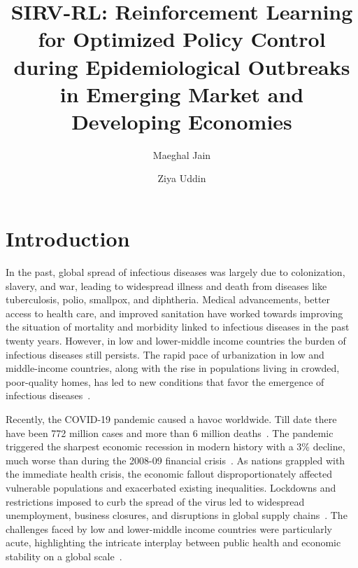 \documentclass[tikz,fleqn,12pt]{wlscirep}
\title{SIRV-RL: Reinforcement Learning for Optimized Policy Control during Epidemiological Outbreaks in Emerging Market and Developing Economies}
\author[1,*]{Maeghal Jain}
\author[1]{Ziya Uddin}
\affil[1]{BML Munjal University}
\affil[*]{e-mail: maeghaljain@gmail.com}
\begin{document}
\flushbottom
\maketitle
\thispagestyle{empty}
\section{Introduction}
In the past, global spread of infectious diseases was largely due to colonization, slavery, and war, leading to widespread illness and death from diseases like tuberculosis, polio, smallpox, and diphtheria. Medical advancements, better access to health care, and improved sanitation have worked towards improving the situation of mortality and morbidity linked to infectious diseases in the past twenty years. However, in low and lower-middle income countries the burden of infectious diseases still persists. The rapid pace of urbanization in low and middle-income countries, along with the rise in populations living in crowded, poor-quality homes, has led to new conditions that favor the emergence of infectious diseases~\cite{Baker2022,inequitableworld}.

Recently, the COVID-19 pandemic caused a havoc worldwide. Till date there have been 772 million cases and more than 6 million deaths~\cite{WHOCovid}. The pandemic triggered the sharpest economic recession in modern history with a 3\% decline, much worse than during the 2008-09 financial crisis~\cite{IMFCovid}. As nations grappled with the immediate health crisis, the economic fallout disproportionately affected vulnerable populations and exacerbated existing inequalities. Lockdowns and restrictions imposed to curb the spread of the virus led to widespread unemployment, business closures, and disruptions in global supply chains~\cite{Nicola2020}. The challenges faced by low and lower-middle income countries were particularly acute, highlighting the intricate interplay between public health and economic stability on a global scale~\cite{Gagnon2023}. 
\end{document}
